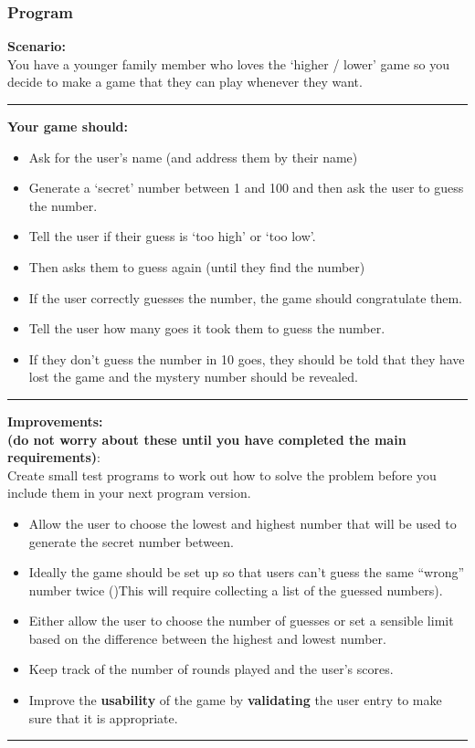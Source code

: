 \documentclass[a4paper,12pt]{article}
\begin{document}
\subsubsection{Program}

\textbf{Scenario:}\\
You have a younger family member who loves the ‘higher / lower’ game so you decide to make a game that they can play whenever they want.\\
\hrule\vspace{0.5cm}
\textbf{Your game should:}
\begin{itemize}
	\item Ask for the user’s name (and address them by their name)
	\item Generate a ‘secret’ number between 1 and 100 and then ask the user to guess the number.
	\item Tell the user if their guess is ‘too high’ or ‘too low’.
	\item Then asks them to guess again (until they find the number)
	\item If the user correctly guesses the number, the game should congratulate them.
	\item Tell the user how many goes it took them to guess the number.
	\item If they don’t guess the number in 10 goes, they should be told that they have lost the game and the mystery number should be revealed.
\end{itemize}

\hrule\vspace{0.5cm}


\textbf{Improvements:\\ (do not worry about these until you have completed the main requirements)}:\\
Create small test programs to work out how to solve the problem before you include them in your next program version.
\begin{itemize}
	\item Allow the user to choose the lowest and highest number that will be used to generate the secret number between.
	\item Ideally the game should be set up so that users can’t guess the same ``wrong'' number twice ()This will require collecting a list of the guessed numbers).
	\item Either allow the user to choose the number of guesses or set a sensible limit based on the difference between the highest and lowest number.
	\item Keep track of the number of rounds played and the user’s scores.
	\item Improve the \textbf{usability} of the game by \textbf{validating} the user entry to make sure that it is appropriate.
\end{itemize}
\hrule\vspace{0.5cm}
\end{document}
